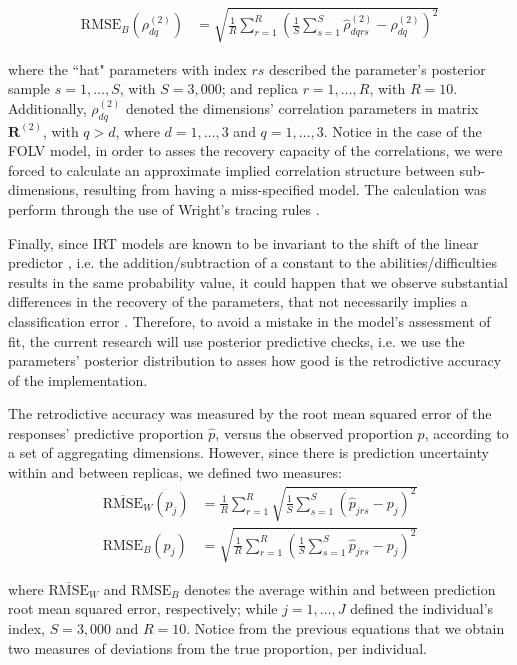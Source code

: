 %
\begin{align}
	\text{RMSE}_{B} \left( \rho^{(2)}_{dq} \right) &=\sqrt{\frac{1}{R} \sum_{r=1}^{R} \left( \frac{1}{S} \sum_{s=1}^{S} \hat{\rho}^{(2)}_{dqrs} - \rho^{(2)}_{dq} \right)^2}
\end{align}

\noindent where the ``hat" parameters with index $rs$ described the parameter's posterior sample $s=1, \dots, S$, with $S=3,000$; and replica $r=1, \dots, R$, with $R=10$. Additionally, $\rho^{(2)}_{dq}$ denoted the dimensions' correlation parameters in matrix $\boldsymbol{R}^{(2)}$, with $q>d$, where $d=1,\dots,3$ and $q=1,\dots,3$. Notice in the case of the FOLV model, in order to asses the recovery capacity of the correlations, we were forced to calculate an approximate implied correlation structure between sub-dimensions, resulting from having a miss-specified model. The calculation was perform through the use of Wright's tracing rules \cite{Beaujean_2014}.

Finally, since IRT models are known to be invariant to the shift of the linear predictor \cite{Baker_et_al_1992, Bock_1972}, i.e. the addition/subtraction of a constant to the abilities/difficulties results in the same probability value, it could happen that we observe substantial differences in the recovery of the parameters, that not necessarily implies a classification error  \cite{Wollack_2002}. Therefore, to avoid a mistake in the model's assessment of fit, the current research will use posterior predictive checks, i.e. we use the parameters' posterior distribution to asses how good is the retrodictive accuracy of the implementation.

The retrodictive accuracy was measured by the root mean squared error of the responses' predictive proportion $\hat{p}$, versus the observed proportion $p$, according to a set of aggregating dimensions. However, since there is prediction uncertainty within and between replicas, we defined two measures:
%
\begin{align}
	\overline{\text{RMSE}}_{W} \left( p_{j} \right) &= \frac{1}{R} \sum_{r=1}^{R} \sqrt{ \frac{1}{S} \sum_{s=1}^{S} \left( \hat{p}_{jrs} - p_{j} \right)^2} \\
	\text{RMSE}_{B} \left( p_{j} \right) &= \sqrt{ \frac{1}{R} \sum_{r=1}^{R}  \left( \frac{1}{S} \sum_{s=1}^{S} \hat{p}_{jrs} - p_{j} \right)^2} 
\end{align}

\noindent where $\overline{\text{RMSE}}_{W}$ and $\text{RMSE}_{B}$ denotes the average within and between prediction root mean squared error, respectively; while $j=1,\dots,J$ defined the individual's index, $S=3,000$ and $R=10$. Notice from the previous equations that we obtain two measures of deviations from the true proportion, per individual.

